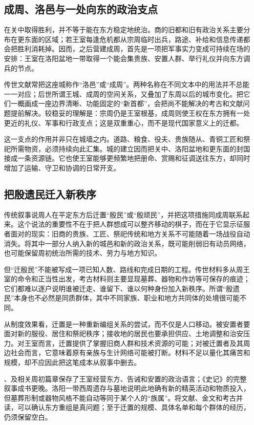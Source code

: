 \subsection{成周、洛邑与一处向东的政治支点}

在关中取得胜利，并不等于能在东方稳定地统治。商的旧都和旧有政治关系主要分布在更东面的区域；若王室每逢危机都从宗周临时出兵，路途、补给和信息传递都会把胜利消耗掉。因而，之后营建成周，首先是一项把军事实力变成可持续在场的安排：王室在洛阳盆地一带取得一个能会集贵族、安置人群、举行礼仪并向东方调兵的节点。

传世文献常把这座城称作“洛邑”或“成周”。两种名称在不同文本中的用法并不总能一一对应；后世所谓王城、成周的空间关系，又叠加了东周以后的城市变化。把它们一概画成一座边界清晰、功能固定的“新首都”，会把尚不能解决的考古和文献问题提前解决。较稳妥的理解是：宗周仍是王室根基，成周则使王权在东方拥有一处更近的礼仪、军事和行政支点；这是双重重心，而不是现代国家意义上的迁都。

这一支点的作用并非只在城墙之内。道路、粮食、役夫、贵族随从、青铜工匠和祭祀所需物资，必须持续向此汇集。城的建立因而把关中、洛阳盆地和更东面的封国接成一条资源链。它也使王室能够更频繁地把册命、赏赐和征调送往东方，却同时增加了运输、守卫和协调的日常开支。

\subsection{把殷遗民迁入新秩序}

传统叙事说周人在平定东方后迁置“殷民”或“殷顽民”，并把这项措施同成周联系起来。这个说法的重要性不在于把人群想成可以整齐移动的棋子，而在于它显示征服者面对的现实：旧商的贵族、工匠、祭祀传统和地方关系不可能随着一场战役自动消失。将其中一部分人纳入新的城邑和新的政治关系，既可能削弱旧有动员网络，也可能保留周初统治所需的技术、劳力与地方知识。

但“迁殷民”不能被写成一项已知人数、路线和完成日期的工程。传世材料多从周王室的命令和正当性出发，考古材料则主要显现墓葬、器物和作坊等可保存的痕迹；它们都难以逐户说明谁被迁走、谁留下、谁以何种身份加入新秩序。所谓“殷遗民”本身也不必然是同质群体，其中不同家族、职业和地方共同体的处境很可能不同。

从制度效果看，迁置是一种重新编组关系的尝试，而不仅是人口移动。被安置者要面对新的服役、居住和祭祀秩序；接收地的居民也要承担供应、土地调整和治安压力。对王室而言，迁置提供了掌握旧商人群和技术资源的可能；对被迁置者及其周边社会而言，它意味着原有亲族与生计网络可能被打断。材料不足以量化其痛苦和规模，却不应因此把这笔成本从叙事中删去。

\begin{sourcenote}
、及相关周初篇章保存了王室经营东方、告诫和安置的政治语言；《史记》的完整叙事成书更晚。洛阳一带西周遗存与墓地说明此地确有新的精英活动和物质投入，但墓葬形制或器物风格不能自动等同于某个人的“族属”。将文献、金文和考古并读，可以确认东方重组是真问题；至于迁置的规模、具体名单和每个群体的经历，仍须保留空白。
\end{sourcenote}


